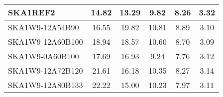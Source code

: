 \begin{table}[H]
{{\begin{tabular}{|lccccc|}
SKA1REF2 & 14.82 \cellcolor{blue!18.00} & 13.29 \cellcolor{red!18.00} & 9.82 \cellcolor{green!33.52} & 8.26 \cellcolor{orange!36.58} & 3.32 \cellcolor{purple!60.00}\\ \hline 
SKA1W9-12A54B90 & 16.55 \cellcolor{blue!27.82} & 19.82 \cellcolor{red!60.00} & 10.81 \cellcolor{green!60.00} & 8.89 \cellcolor{orange!60.00} & 3.10 \cellcolor{purple!19.83}\\ \hline 
SKA1W9-12A60B100 & 18.94 \cellcolor{blue!41.38} & 18.57 \cellcolor{red!51.96} & 10.60 \cellcolor{green!54.38} & 8.70 \cellcolor{orange!52.94} & 3.09 \cellcolor{purple!18.00}\\ \hline 
SKA1W9-0A60B100 & 17.69 \cellcolor{blue!34.29} & 16.93 \cellcolor{red!41.41} & 9.24 \cellcolor{green!18.00} & 7.76 \cellcolor{orange!18.00} & 3.12 \cellcolor{purple!23.48}\\ \hline 
SKA1W9-12A72B120 & 21.61 \cellcolor{blue!56.54} & 16.18 \cellcolor{red!36.59} & 10.35 \cellcolor{green!47.69} & 8.27 \cellcolor{orange!36.96} & 3.14 \cellcolor{purple!27.13}\\ \hline 
SKA1W9-12A80B133 & 22.22 \cellcolor{blue!60.00} & 15.00 \cellcolor{red!29.00} & 10.23 \cellcolor{green!44.48} & 7.97 \cellcolor{orange!25.81} & 3.11 \cellcolor{purple!21.65}\\ \hline 
\end{tabular}}
\vspace{0.000000cm}
\hspace{1cm} 
}
\end{table}
